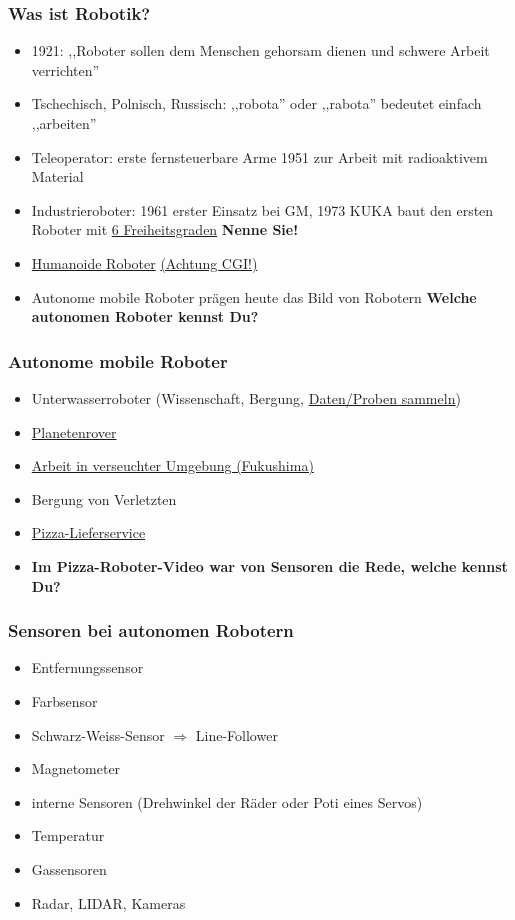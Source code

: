 \documentclass{beamer}
\begin{document}
\begin{frame}
\frametitle{Was ist Robotik?}
\begin{itemize}
\item 1921: ,,Roboter sollen dem Menschen gehorsam dienen und schwere Arbeit verrichten''
\item Tschechisch, Polnisch, Russisch: ,,robota'' oder ,,rabota'' bedeutet einfach ,,arbeiten'' 
\item Teleoperator: erste fernsteuerbare Arme 1951 zur Arbeit mit radioaktivem Material
\item Industrieroboter: 1961 erster Einsatz bei GM, 1973 KUKA baut den ersten Roboter mit \href{https://www.computerbild.de/artikel/cb-Tests-Handy-So-testet-COMPUTER-BILD-Smartphones-25287581.html}{6 Freiheitsgraden} \textbf{Nenne Sie!}
\item \href{https://www.youtube.com/watch?v=_sBBaNYex3E}{Humanoide Roboter} \href{https://youtu.be/dKjCWfuvYxQ?list=PLByDuMFhvvr77bbMhXFQ73Km0BddpccQN}{(Achtung CGI!)}
\item Autonome mobile Roboter prägen heute das Bild von Robotern \textbf{Welche autonomen Roboter kennst Du?}
\end{itemize}
\end{frame}

\begin{frame}
\frametitle{Autonome mobile Roboter}
\begin{itemize}
\item  Unterwasserroboter (Wissenschaft, Bergung, \href{https://youtu.be/dF1Yb3Fa5sE?t=257}{Daten/Proben sammeln}) 
\item  \href{https://www.youtube.com/watch?v=5qqsMjy8Rx0}{Planetenrover}
\item  \href{https://www.youtube.com/watch?v=mhQixNlLF_k}{Arbeit in verseuchter Umgebung (Fukushima)}
\item  Bergung von Verletzten
\item  \href{https://www.youtube.com/watch?v=ujzjZuhE92g}{Pizza-Lieferservice} 
\item \textbf{Im Pizza-Roboter-Video war von Sensoren die Rede, welche kennst Du?}
\end{itemize}
\end{frame}

\begin{frame}
\frametitle{Sensoren bei autonomen Robotern}
\begin{itemize}
\item   Entfernungssensor
\item  Farbsensor
\item   Schwarz-Weiss-Sensor $\Rightarrow$ Line-Follower
\item   Magnetometer
\item  interne Sensoren (Drehwinkel der Räder oder Poti eines Servos)
\item Temperatur
\item Gassensoren
\item Radar, LIDAR, Kameras
\end{itemize}
\end{frame}
\end{document}
